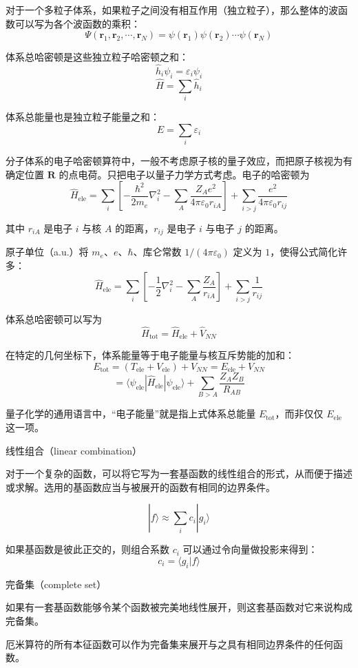 对于一个多粒子体系，如果粒子之间没有相互作用（独立粒子），那么整体的波函数可以写为各个波函数的乘积：
\[
\Psi(\mathbf r_1,\mathbf r_2,\cdots,\mathbf r_N)=\psi(\mathbf r_1)\psi(\mathbf r_2)\cdots\psi(\mathbf r_N)
\]

体系总哈密顿是这些独立粒子哈密顿之和：
\[
\hat h_i\psi_i=\varepsilon_i\psi_i
\]
\[
\hat H=\sum_i \hat h_i
\]

体系总能量也是独立粒子能量之和：
\[
E=\sum_i \varepsilon_i
\]

分子体系的电子哈密顿算符中，一般不考虑原子核的量子效应，而把原子核视为有确定位置 $\mathbf R$ 的点电荷。只把电子以量子力学方式考虑。电子的哈密顿为
\[
\hat H_{\mathrm{ele}}
=
\sum_i\left[
-\frac{\hbar^2}{2m_e}\nabla_i^2
-\sum_A\frac{Z_Ae^2}{4\pi\varepsilon_0 r_{iA}}
\right]
+
\sum_{i>j}\frac{e^2}{4\pi\varepsilon_0 r_{ij}}
\]

其中 $r_{iA}$ 是电子 $i$ 与核 $A$ 的距离，$r_{ij}$ 是电子 $i$ 与电子 $j$ 的距离。

原子单位（a.u.）将 $m_e$、$e$、$\hbar$、库仑常数 $1/(4\pi\varepsilon_0)$ 定义为 $1$，使得公式简化许多：
\[
\hat H_{\mathrm{ele}}
=
\sum_i\left[
-\frac{1}{2}\nabla_i^2
-\sum_A\frac{Z_A}{r_{iA}}
\right]
+
\sum_{i>j}\frac{1}{r_{ij}}
\]

体系总哈密顿可以写为
\[
\hat H_{\mathrm{tot}}=\hat H_{\mathrm{ele}}+\hat V_{NN}
\]

在特定的几何坐标下，体系能量等于电子能量与核互斥势能的加和：
\[
E_{\mathrm{tot}}
=(T_{\mathrm{ele}}+V_{\mathrm{ele}})+V_{NN}
=
E_{\mathrm{ele}}+V_{NN}
\]
\[
=
\langle \psi_{\mathrm{ele}}|\hat H_{\mathrm{ele}}|\psi_{\mathrm{ele}}\rangle
+
\sum_{B>A}\frac{Z_AZ_B}{R_{AB}}
\]

量子化学的通用语言中，“电子能量”就是指上式体系总能量 $E_{\mathrm{tot}}$，而非仅仅 $E_{\mathrm{ele}}$ 这一项。

线性组合（linear combination）

对于一个复杂的函数，可以将它写为一套基函数的线性组合的形式，从而便于描述或求解。选用的基函数应当与被展开的函数有相同的边界条件。

\[
|f\rangle \approx \sum_i c_i |g_i\rangle
\]

如果基函数是彼此正交的，则组合系数 $c_i$ 可以通过令向量做投影来得到：
\[
c_i=\langle g_i|f\rangle
\]

完备集（complete set）

如果有一套基函数能够令某个函数被完美地线性展开，则这套基函数对它来说构成完备集。

厄米算符的所有本征函数可以作为完备集来展开与之具有相同边界条件的任何函数。

